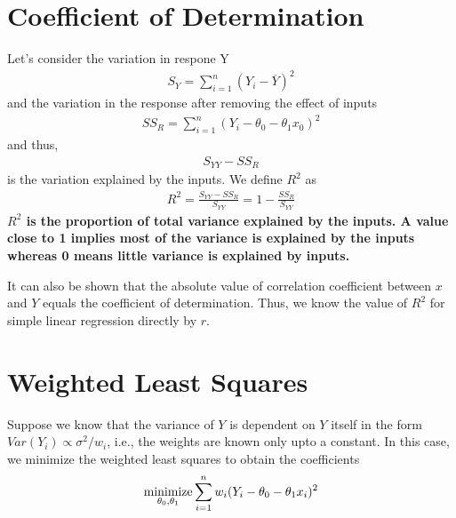\documentclass[../probability-notes.tex]{subfiles}
\begin{document}
    \section{Coefficient of Determination}
    Let's consider the variation in respone Y
    \begin{align*}
        S_{Y} = \sum_{i=1}^{n} (Y_{i} - \overline{Y})^{2}
    \end{align*}
    and the variation in the response after removing the effect of inputs
    \begin{align*}
        SS_{R} = \sum_{i=1}^{n} (Y_{i} - \theta_{0} - \theta_{1}x_{0})^{2}
    \end{align*}
    and thus,
    \begin{align*}
        S_{YY} - SS_{R}
    \end{align*}
    is the variation explained by the inputs. We define $R^{2}$ as
    \begin{align*}
        R^{2} = \frac{S_{YY} - SS_{R}}{S_{YY}} = 1 - \frac{SS_{R}}{S_{YY}}
    \end{align*}
    \textbf{$R^{2}$ is the proportion of total variance explained by the inputs. A value close to 1 implies most of the variance is explained by the inputs whereas 0 means little variance is explained by inputs.}\newline

    It can also be shown that the absolute value of correlation coefficient between $x$ and $Y$ equals the coefficient of determination. Thus, we know the value of $R^{2}$ for simple linear regression directly by $r$.


    \section{Weighted Least Squares}
    Suppose we know that the variance of $Y$ is dependent on $Y$ itself in the form $Var(Y_{i}) \propto \sigma^{2}/w_{i}$, i.e., the weights are known only upto a constant. In this case, we minimize the weighted least squares to obtain the coefficients
    \begin{align*}
        \operatorname*{minimize}_{\theta_{0}, \theta_{1}} \sum_{i=1}^{n} w_{i}(Y_{i} - \theta_{0} - \theta_{1}x_{i})^{2}
    \end{align*}
\end{document}
